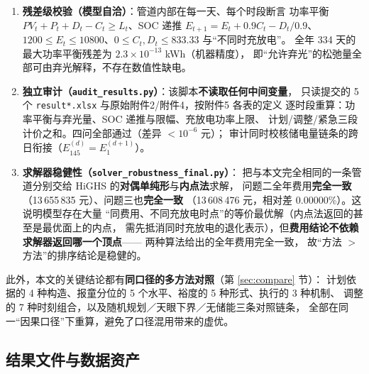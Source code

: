 \documentclass[12pt,a4paper,fontset=fandol]{ctexart}
\begin{document}
\begin{enumerate}[label=(\arabic*), leftmargin=2.2em, itemsep=1pt]
\item \textbf{残差级校验（模型自洽\nobreak）}\nobreak：管道内部在每一天\nobreak、每个时段断言
功率平衡 $PV_t+P_t+D_t-C_t\ge L_t$\nobreak、SOC 递推 $E_{t+1}=E_t+0.9C_t-D_t/0.9$\nobreak、
$1200\le E_t\le10800$\nobreak、$0\le C_t,D_t\le833.33$ 与“不同时充放电\nobreak”\nobreak。
全年 334 天的最大功率平衡残差为 $2.3\times10^{-13}$ kWh（机器精度\nobreak）\nobreak，
即“允许弃光\nobreak”的松弛量全部可由弃光解释\nobreak，不存在数值性缺电\nobreak。
\item \textbf{独立审计（\texttt{audit\_results.py}\nobreak）}\nobreak：该脚本\textbf{不读取任何中间变量}\nobreak，
只读提交的 5 个 \texttt{result*.xlsx} 与原始附件2/附件4\nobreak，按附件5 各表的定义
逐时段重算\nobreak：功率平衡与弃光量\nobreak、SOC 递推与限幅\nobreak、充放电功率上限\nobreak、
计划/调整/紧急三段计价之和\nobreak。四问全部通过（差异 $<10^{-6}$ 元\nobreak）\nobreak；
审计同时校核储电量链条的跨日衔接（$E_{145}^{(d)}=E_1^{(d+1)}$\nobreak）\nobreak。
\item \textbf{求解器稳健性（\texttt{solver\_robustness\_final.py}\nobreak）}\nobreak：
把与本文完全相同的一条管道分别交给 HiGHS 的\textbf{对偶单纯形}与\textbf{内点法}求解\nobreak，
问题二全年费用\textbf{完全一致}（13\,655\,835 元\nobreak）\nobreak、问题三也\textbf{完全一致}
（13\,608\,476 元\nobreak，相对差 0.00000\%\nobreak）\nobreak。这说明模型存在大量
“同费用\nobreak、不同充放电时点\nobreak”的等价最优解（内点法返回的甚至是最优面上的内点\nobreak，
需先抵消同时充放电的退化表示\nobreak）\nobreak，但\textbf{费用结论不依赖求解器返回哪一个顶点}——
两种算法给出的全年费用完全一致\nobreak，
故“方法 $>$ 方法\nobreak”的排序结论是稳健的\nobreak。
\end{enumerate}

此外\nobreak，本文的关键结论都有\textbf{同口径的多方法对照}（第 \ref{sec:compare} 节\nobreak）\nobreak：
计划依据的 4 种构造\nobreak、报童分位的 5 个水平\nobreak、裕度的 5 种形式\nobreak、执行的 3 种机制\nobreak、
调整的 7 种时刻组合\nobreak，以及随机规划／天眼下界／无储能三条对照链条\nobreak，
全部在同一“因果口径\nobreak”下重算\nobreak，避免了口径混用带来的虚优\nobreak。

\subsection{结果文件与数据资产}
\end{document}
